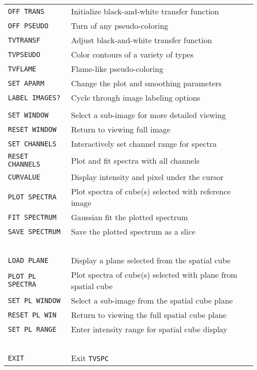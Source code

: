 \documentclass[twoside]{article}
\newcommand{\Hi}[1]{\textcolor{hicol}{#1}}
\newcommand{\Me}[1]{\textcolor{mecol}{#1}}
\begin{document}
\begin{center}
\begin{tabular}{|l|l|}\hline
 {\tt OFF TRANS      } & Initialize black-and-white transfer function \\
 {\tt OFF PSEUDO     } & Turn of any pseudo-coloring \\
 {\tt TVTRANSF       } & Adjust black-and-white transfer function \\
 {\tt TVPSEUDO       } & Color contours of a variety of types \\
 {\tt TVFLAME        } & Flame-like pseudo-coloring \\
 {\tt SET APARM      } & Change the plot and smoothing parameters \\
\Hi{\tt LABEL IMAGES?} & \Hi{Cycle through image labeling options} \\
 {\tt                } & \\
 {\tt SET WINDOW     } & Select a sub-image for more detailed viewing \\
 {\tt RESET WINDOW   } & Return to viewing full image \\
 {\tt SET CHANNELS   } & Interactively set channel range for spectra \\
 {\tt RESET CHANNELS } & Plot and fit spectra with all channels \\
\Hi{\tt CURVALUE     } & \Hi{Display intensity and pixel under the
                         cursor}\\
 {\tt PLOT SPECTRA   } & Plot spectra of cube(s) selected with
                         reference image  \\
 {\tt FIT SPECTRUM   } & Gaussian fit the plotted spectrum \\
 {\tt SAVE SPECTRUM  } & Save the plotted spectrum as a slice \\
 {\                  } & \\
\Me{{\tt LOAD PLANE }} & \Me{Display a plane selected from the spatial
                         cube} \\
\Me{{\tt PLOT PL SPECTRA}}&\Me{Plot spectra of cube(s) selected with
                         plane from spatial cube}\\
\Me{{\tt SET PL WINDOW}}  &\Me{Select a sub-image from the spatial
                           cube plane} \\
\Me{\tt{RESET PL WIN}} &\Me{Return to viewing the full spatial cube
                         plane}\\
\Me{{\tt SET PL RANGE}}&\Me{Enter intensity range for spatial cube
                         display}\\
 {\                  } & \\
 {\tt EXIT           } & Exit {\tt TVSPC}\\ \hline
\end{tabular}
\end{center}
\end{document}
